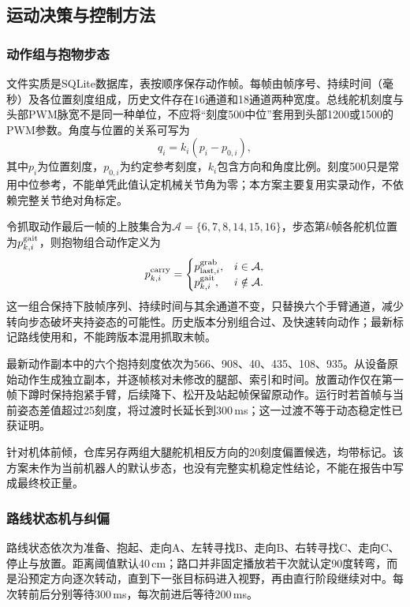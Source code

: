 \subsection{运动决策与控制方法}
\subsubsection{动作组与抱物步态}
文件实质是SQLite数据库，表按顺序保存动作帧。每帧由帧序号、持续时间（毫秒）及各位置刻度组成，历史文件存在16通道和18通道两种宽度。总线舵机刻度与头部PWM脉宽不是同一种单位，不应将“刻度500中位”套用到头部1200或1500的PWM参数。角度与位置的关系可写为
\begin{equation}
q_i=k_i(p_i-p_{0,i}),
\end{equation}
其中$p_i$为位置刻度，$p_{0,i}$为约定参考刻度，$k_i$包含方向和角度比例。刻度500只是常用中位参考，不能单凭此值认定机械关节角为零；本方案主要复用实录动作，不依赖完整关节绝对角标定。

令抓取动作最后一帧的上肢集合为$\mathcal A=\{6,7,8,14,15,16\}$，步态第$k$帧各舵机位置为$p_{k,i}^{\rm gait}$，则抱物组合动作定义为
\begin{equation}
p_{k,i}^{\rm carry}=\begin{cases}
p_{{\rm last},i}^{\rm grab},&i\in\mathcal A,\\
p_{k,i}^{\rm gait},&i\notin\mathcal A.
\end{cases}
\end{equation}
这一组合保持下肢帧序列、持续时间与其余通道不变，只替换六个手臂通道，减少转向步态破坏夹持姿态的可能性。历史版本分别组合过、及快速转向动作；最新标记路线使用和，不能跨版本混用抓取末帧。

最新动作副本中的六个抱持刻度依次为566、908、40、435、108、935。从设备原始动作生成独立副本，并逐帧核对未修改的腿部、索引和时间。放置动作仅在第一帧下蹲时保持抱紧手臂，后续降下、松开及站起帧保留原动作。运行时若首帧与当前姿态差值超过25刻度，将过渡时长延长到300\,ms；这一过渡不等于动态稳定性已获证明。

针对机体前倾，仓库另存两组大腿舵机相反方向的20刻度偏置候选，均带标记。该方案未作为当前机器人的默认步态，也没有完整实机稳定性结论，不能在报告中写成最终校正量。
\subsubsection{路线状态机与纠偏}
路线状态依次为准备、抱起、走向A、左转寻找B、走向B、右转寻找C、走向C、停止与放置。距离阈值默认40\,cm；路口并非固定播放若干次就认定90度转弯，而是沿预定方向逐次转动，直到下一张目标码进入视野，再由直行阶段继续对中。每次转前后分别等待300\,ms，每次前进后等待200\,ms。

